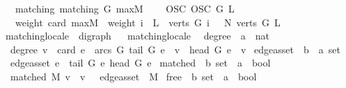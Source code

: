 \begin{isabellebody}
\ \ \ matching{\isacharcolon}\ {\isachardoublequoteopen}matching\ G\ maxM{\isachardoublequoteclose}\ \isanewline
\ \ \ OSC{\isacharcolon}\ {\isachardoublequoteopen}OSC\ G\ L{\isachardoublequoteclose}\isanewline
\ \ \ weight{\isacharcolon}\ {\isachardoublequoteopen}card\ maxM\ {\isacharequal}\ weight\ {\isacharbraceleft}i\ {\isasymin}\ L\ {\isacharbackquote}\ verts\ G{\isachardot}\ i\ {\isachargreater}\ {}{\isacharbraceright}\ {\isacharparenleft}N\ {\isacharparenleft}verts\ G{\isacharparenright}\ L{\isacharparenright}{\isachardoublequoteclose}\isanewline
\isanewline
{}\isamarkupfalse%
\ matching{\isacharunderscore}locale\ {\isasymsubseteq}\ digraph%
\isadelimproof
\ %
\endisadelimproof
%
\isatagproof
\isacommand{{\isachardot}{\isachardot}}\isamarkupfalse%
%
\endisatagproof
{\isafoldproof}%
%
\isadelimproof
%
\endisadelimproof
\isanewline
\isanewline
{}\isamarkupfalse%
\ matching{\isacharunderscore}locale\ \isanewline
\isanewline
{}\isamarkupfalse%
\ degree\ {\isacharcolon}{\isacharcolon}\ {\isachardoublequoteopen}{\isacharprime}a\ {\isasymRightarrow}\ nat{\isachardoublequoteclose}\ \isanewline
\ \ {\isachardoublequoteopen}degree\ v\ {\isasymequiv}\ card\ {\isacharbraceleft}e\ {\isasymin}\ arcs\ G{\isachardot}\ tail\ G\ e\ {\isacharequal}\ v\ {\isasymor}\ head\ G\ e\ {\isacharequal}\ v{\isacharbraceright}{\isachardoublequoteclose}\isanewline
\isanewline
{}\isamarkupfalse%
\ edge{\isacharunderscore}as{\isacharunderscore}set\ {\isacharcolon}{\isacharcolon}\ {\isachardoublequoteopen}{\isacharprime}b\ {\isasymRightarrow}\ {\isacharprime}a\ set{\isachardoublequoteclose}\ \isanewline
\ \ {\isachardoublequoteopen}edge{\isacharunderscore}as{\isacharunderscore}set\ e\ {\isasymequiv}\ {\isacharbraceleft}tail\ G\ e{\isacharcomma}\ head\ G\ e{\isacharbraceright}{\isachardoublequoteclose}\isanewline
\isanewline
{}\isamarkupfalse%
\ matched\ {\isacharcolon}{\isacharcolon}\ {\isachardoublequoteopen}{\isacharprime}b\ set\ {\isasymRightarrow}\ {\isacharprime}a\ {\isasymRightarrow}\ bool{\isachardoublequoteclose}\ \isanewline
\ \ {\isachardoublequoteopen}matched\ M\ v\ {\isasymequiv}\ v\ {\isasymin}\ {\isasymUnion}\ {\isacharparenleft}edge{\isacharunderscore}as{\isacharunderscore}set\ {\isacharbackquote}\ M{\isacharparenright}{\isachardoublequoteclose}\isanewline
\isanewline
{}\isamarkupfalse%
\ free\ {\isacharcolon}{\isacharcolon}\ {\isachardoublequoteopen}{\isacharprime}b\ set\ {\isasymRightarrow}\ {\isacharprime}a\ {\isasymRightarrow}\ bool{\isachardoublequoteclose}\ \isanewline

\end{isabellebody}
